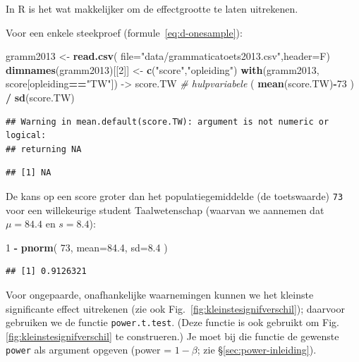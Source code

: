 \documentclass[
]{book}
\newenvironment{Shaded}{\begin{snugshade}}{\end{snugshade}}
\newcommand{\AttributeTok}[1]{\textcolor[rgb]{0.13,0.29,0.53}{#1}}
\newcommand{\CommentTok}[1]{\textcolor[rgb]{0.56,0.35,0.01}{\textit{#1}}}
\newcommand{\DecValTok}[1]{\textcolor[rgb]{0.00,0.00,0.81}{#1}}
\newcommand{\FloatTok}[1]{\textcolor[rgb]{0.00,0.00,0.81}{#1}}
\newcommand{\FunctionTok}[1]{\textcolor[rgb]{0.13,0.29,0.53}{\textbf{#1}}}
\newcommand{\NormalTok}[1]{#1}
\newcommand{\OtherTok}[1]{\textcolor[rgb]{0.56,0.35,0.01}{#1}}
\newcommand{\SpecialCharTok}[1]{\textcolor[rgb]{0.81,0.36,0.00}{\textbf{#1}}}
\newcommand{\StringTok}[1]{\textcolor[rgb]{0.31,0.60,0.02}{#1}}
\begin{document}
In R is het wat makkelijker om de effectgrootte te laten uitrekenen.

Voor een enkele steekproef (formule~\eqref{eq:d-onesample}):\\

\begin{Shaded}
\begin{Highlighting}[]
\NormalTok{gramm2013 }\OtherTok{\textless{}{-}} \FunctionTok{read.csv}\NormalTok{( }\AttributeTok{file=}\StringTok{"data/grammaticatoets2013.csv"}\NormalTok{,}\AttributeTok{header=}\NormalTok{F)}
\FunctionTok{dimnames}\NormalTok{(gramm2013)[[}\DecValTok{2}\NormalTok{]] }\OtherTok{\textless{}{-}} \FunctionTok{c}\NormalTok{(}\StringTok{"score"}\NormalTok{,}\StringTok{"opleiding"}\NormalTok{)}
\FunctionTok{with}\NormalTok{(gramm2013, score[opleiding}\SpecialCharTok{==}\StringTok{"TW"}\NormalTok{]) }\OtherTok{{-}\textgreater{}}\NormalTok{ score.TW }\CommentTok{\# hulpvariabele}
\NormalTok{( }\FunctionTok{mean}\NormalTok{(score.TW)}\SpecialCharTok{{-}}\DecValTok{73}\NormalTok{ ) }\SpecialCharTok{/} \FunctionTok{sd}\NormalTok{(score.TW) }
\end{Highlighting}
\end{Shaded}

\begin{verbatim}
## Warning in mean.default(score.TW): argument is not numeric or logical:
## returning NA
\end{verbatim}

\begin{verbatim}
## [1] NA
\end{verbatim}

De kans op een score groter dan het populatiegemiddelde (de toetswaarde)
\texttt{73} voor een willekeurige student Taalwetenschap (waarvan we aannemen
dat \(\mu=84.4\) en \(s=8.4\)):

\begin{Shaded}
\begin{Highlighting}[]
\DecValTok{1} \SpecialCharTok{{-}} \FunctionTok{pnorm}\NormalTok{( }\DecValTok{73}\NormalTok{, }\AttributeTok{mean=}\FloatTok{84.4}\NormalTok{, }\AttributeTok{sd=}\FloatTok{8.4}\NormalTok{ ) }
\end{Highlighting}
\end{Shaded}

\begin{verbatim}
## [1] 0.9126321
\end{verbatim}

Voor ongepaarde, onafhankelijke waarnemingen kunnen we het kleinste
significante effect uitrekenen (zie ook
Fig.~\ref{fig:kleinstesignifverschil}); daarvoor gebruiken we de
functie \texttt{power.t.test}. (Deze functie is ook gebruikt om
Fig.\ref{fig:kleinstesignifverschil} te construeren.) Je moet bij die
functie de gewenste \texttt{power} als argument opgeven (power = \(1-\beta\); zie
§\ref{sec:power-inleiding}).
\end{document}
